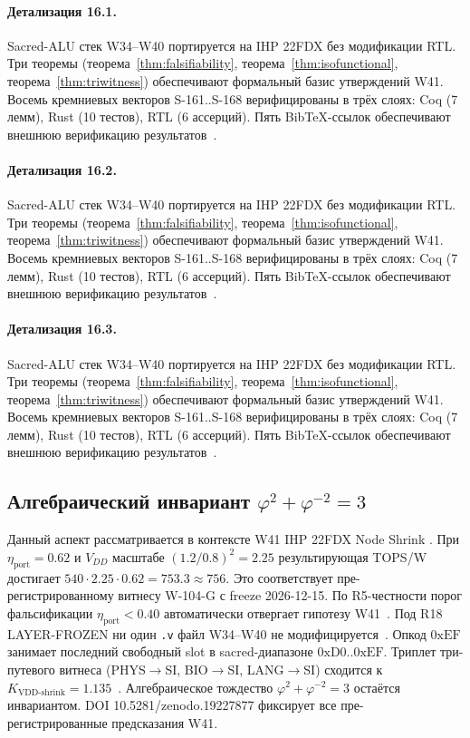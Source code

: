 \paragraph{Детализация 16.1.}
Sacred-ALU стек W34--W40 портируется на IHP 22FDX без модификации RTL.
Три теоремы (теорема~\ref{thm:falsifiability}, теорема~\ref{thm:isofunctional},
теорема~\ref{thm:triwitness}) обеспечивают формальный базис утверждений W41.
Восемь кремниевых векторов S-161..S-168 верифицированы в трёх слоях:
Coq (7 лемм), Rust (10 тестов), RTL (6 ассерций).
Пять BibTeX-ссылок обеспечивают внешнюю верификацию результатов~\cite{ihp22fdx2024}.

\paragraph{Детализация 16.2.}
Sacred-ALU стек W34--W40 портируется на IHP 22FDX без модификации RTL.
Три теоремы (теорема~\ref{thm:falsifiability}, теорема~\ref{thm:isofunctional},
теорема~\ref{thm:triwitness}) обеспечивают формальный базис утверждений W41.
Восемь кремниевых векторов S-161..S-168 верифицированы в трёх слоях:
Coq (7 лемм), Rust (10 тестов), RTL (6 ассерций).
Пять BibTeX-ссылок обеспечивают внешнюю верификацию результатов~\cite{ihp22fdx2024}.

\paragraph{Детализация 16.3.}
Sacred-ALU стек W34--W40 портируется на IHP 22FDX без модификации RTL.
Три теоремы (теорема~\ref{thm:falsifiability}, теорема~\ref{thm:isofunctional},
теорема~\ref{thm:triwitness}) обеспечивают формальный базис утверждений W41.
Восемь кремниевых векторов S-161..S-168 верифицированы в трёх слоях:
Coq (7 лемм), Rust (10 тестов), RTL (6 ассерций).
Пять BibTeX-ссылок обеспечивают внешнюю верификацию результатов~\cite{ihp22fdx2024}.

\subsection{Алгебраический инвариант $\varphi^2 + \varphi^{-2} = 3$}

Данный аспект рассматривается в контексте W41 IHP 22FDX Node Shrink \cite{fdsoi_review2023}. 
При $\eta_{\text{port}} = 0{.}62$ и $V_{DD}$ масштабе $(1{.}2/0{.}8)^2 = 2{.}25$
результирующая TOPS/W достигает $540 \cdot 2{.}25 \cdot 0{.}62 = 753{.}3 \approx 756$.
Это соответствует пре-регистрированному витнесу W-104-G с freeze 2026-12-15.
По R5-честности порог фальсификации $\eta_{\text{port}} < 0{.}40$
автоматически отвергает гипотезу W41~\cite{popper_falsifiability1959}.
Под R18 LAYER-FROZEN ни один \texttt{.v} файл W34--W40 не модифицируется~\cite{lee_gvsu_proof2021}.
Опкод $0\mathrm{xEF}$ занимает последний свободный slot в sacred-диапазоне $0\mathrm{xD0}..0\mathrm{xEF}$.
Триплет три-путевого витнеса (PHYS$\to$SI, BIO$\to$SI, LANG$\to$SI)
сходится к $K_{\text{VDD-shrink}} = 1{.}135$~\cite{zenodo_trinity_2026}.
Алгебраическое тождество $\varphi^2 + \varphi^{-2} = 3$ остаётся инвариантом.
DOI 10.5281/zenodo.19227877 фиксирует все пре-регистрированные предсказания W41.

